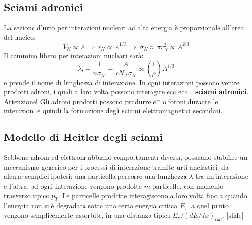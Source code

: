 \subsection{Sciami adronici}
La sezione d'urto per interazioni nucleari ad alta energia è proporzionale all'area del nucleo:
\begin{equation*}
    V_N\propto A\,\Rightarrow\,r_N\propto A^{1/3}\,\Rightarrow\,\sigma_N\approx\pi r_N^2\propto A^{2/3}
\end{equation*}
Il cammino libero per interazioni nucleari sarà:
\begin{equation*}
    \lambda_l=\frac{1}{n\sigma_N}=\frac{A}{\rho N_A\sigma_N}\propto\left(\frac{1}{\rho}\right)A^{1/3}
\end{equation*}
e prende il nome di lunghezza di interazione. In ogni interazioni possono venire prodotti adroni, i quali a loro volta possono interagire ecc ecc... \textbf{sciami adronici}. Attenzione! Gli adroni prodotti possono produrre $e^{\pm}$ o fotoni durante le interazioni e quindi la formazione degli sciami elettromagnetici secondari.
\subsection{Modello di Heitler degli sciami}
Sebbene adroni ed elettroni abbiano comportamenti diversi, possiamo stabilire un meccanismo generico per i processi di interazione tramite urti anelastici, da alcune semplici ipotesi: una particella percorre una lunghezza $\lambda$ tra un'interazione e l'altra; ad ogni interazione vengono prodotte $m$ particelle, con momento trasverso tipico $p_T$. Le particelle prodotte interagiscono a loro volta fino a quando l'energia non si è degradata sotto una certa energia critica $E_c$. a quel punto vengono semplicemente assorbite, in una distanza tipica $E_c/(dE/dx)_{coll}$. [slide]